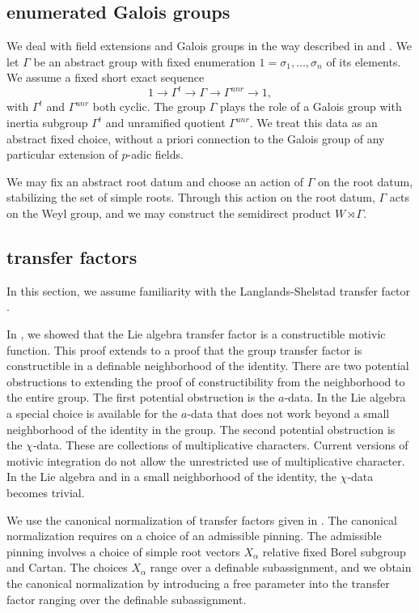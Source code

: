 \subsection{enumerated Galois groups}

We deal with field extensions and Galois groups in the way described in \cite{gordon} and \cite{cluckers2011transfer}.
We let $\Gamma$ be an abstract group with fixed enumeration $1=\sigma_1,\ldots,\sigma_n$ of its elements.  We
assume a fixed short exact sequence
\[
1\to \Gamma^t\to\Gamma\to\Gamma^{unr}\to 1,
\]
with $\Gamma^t$ and $\Gamma^{unr}$ both cyclic.
The group $\Gamma$ plays the role of a Galois group with inertia subgroup $\Gamma^t$ and unramified quotient $\Gamma^{unr}$.
We treat this data as an abstract fixed choice, without a priori connection to the Galois group of any particular extension of 
$p$-adic fields.  

We may fix an abstract root datum and choose an action of $\Gamma$ on the root datum, stabilizing the set of simple roots.
Through this action on the root datum, $\Gamma$ acts on the Weyl group, and we may construct the semidirect product $W\rtimes \Gamma$.

\subsection{transfer factors}

In this section, we assume familiarity with the Langlands-Shelstad transfer factor \cite{langlands1987definition}.

In \cite{gordon}, we showed that the Lie algebra transfer factor is a constructible motivic function.  This proof extends to a proof
that the group transfer factor is constructible in a definable neighborhood of the identity.  There are two potential obstructions to
extending the proof of constructibility from
the neighborhood to the entire group.  The first potential obstruction is the $a$-data.  In the Lie algebra a special choice is available
for the $a$-data that does not work beyond a small neighborhood of the identity in the group.   The second potential obstruction is 
the $\chi$-data.  These are collections of multiplicative characters.  Current versions of motivic integration do not allow the unrestricted
use of multiplicative character.  In the Lie algebra and in a small neighborhood of the identity, the $\chi$-data becomes trivial.

We use the canonical normalization of transfer factors given in \cite[\S7]{hales1993simple}.  The canonical normalization requires
on a choice of an admissible pinning.  The admissible pinning involves a choice of simple root vectors $X_\alpha$ relative fixed Borel subgroup and Cartan.
The choices $X_\alpha$ range over a definable subassignment, and we obtain the canonical normalization by introducing a free
parameter into the transfer factor ranging over the definable subassignment.

